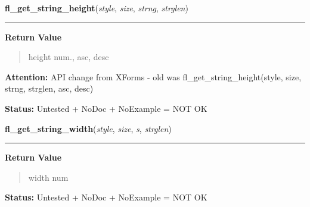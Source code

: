     \label{xformslib:library:fl_get_string_height}

    \vspace{0.5ex}

\hspace{.8\funcindent}\begin{boxedminipage}{\funcwidth}

    \raggedright \textbf{fl\_get\_string\_height}(\textit{style}, \textit{size}, \textit{strng}, \textit{strglen})

    \vspace{-1.5ex}

    \rule{\textwidth}{0.5\fboxrule}
\setlength{\parskip}{2ex}
\setlength{\parskip}{1ex}
      \textbf{Return Value}
    \vspace{-1ex}

      \begin{quote}
      height num., asc, desc

      \end{quote}

\textbf{Attention:} API change from XForms - old was fl\_get\_string\_height(style, size, 
strng, strglen, asc, desc)



\textbf{Status:} Untested + NoDoc + NoExample = NOT OK



    \end{boxedminipage}

    \label{xformslib:library:fl_get_string_width}

    \vspace{0.5ex}

\hspace{.8\funcindent}\begin{boxedminipage}{\funcwidth}

    \raggedright \textbf{fl\_get\_string\_width}(\textit{style}, \textit{size}, \textit{s}, \textit{strglen})

    \vspace{-1.5ex}

    \rule{\textwidth}{0.5\fboxrule}
\setlength{\parskip}{2ex}
\setlength{\parskip}{1ex}
      \textbf{Return Value}
    \vspace{-1ex}

      \begin{quote}
      width num

      \end{quote}

\textbf{Status:} Untested + NoDoc + NoExample = NOT OK



    \end{boxedminipage}

